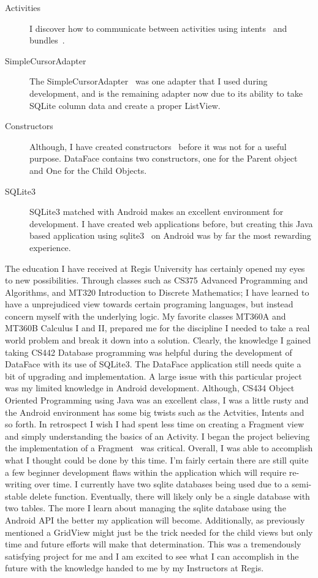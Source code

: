 \documentclass[fontsize=11pt, %
paper=a4, %
twoside, %
captions=tableheading,
index=totoc,
hyperref]{labbook}
\begin{document}
\begin{description}
\item[Activities] I discover how to communicate between activities using intents~\citep{Intent} and bundles~\citep{Bundle}.
\item[SimpleCursorAdapter] The SimpleCursorAdapter~\citep{SimpleCursorAdapter} was one adapter that I used during development, and is the remaining adapter now due to its ability to take SQLite column data and create a proper ListView.
\item[Constructors] Although, I have created constructors~\citep{Ravi} before it was not for a useful purpose. DataFace contains two constructors, one for the Parent object and One for the Child Objects.
\item[SQLite3] SQLite3 matched with Android makes an excellent environment for development. I have created web applications before, but creating this Java based application using sqlite3~\citep{vogella} on Android was by far the most rewarding experience.
\end{description}
\begin{onehalfspace}
	The education I have received at Regis University has certainly opened my eyes to new possibilities. Through classes such as CS375 Advanced Programming and Algorithms, and MT320 Introduction to Discrete Mathematics; I have learned to have a unprejudiced view towards certain programing languages, but instead concern myself with the underlying logic. My favorite classes MT360A and MT360B Calculus I and II, prepared me for the discipline I needed to take a real world problem and break it down into a solution. Clearly, the knowledge I gained taking CS442 Database programming was helpful during the development of DataFace with its use of SQLite3. The DataFace application still needs quite a bit of upgrading and implementation. A large issue with this particular project was my limited knowledge in Android development. Although, CS434 Object Oriented Programming using Java was an excellent class, I was a little rusty and the Android environment has some big twists such as the Actvities, Intents and so forth. In retrospect I wish I had spent less time on creating a Fragment view and simply understanding the basics of an Activity. I began the project believing the implementation of a Fragment~\citep{fragments} was critical.  Overall, I was able to accomplish what I thought could be done by this time. I'm fairly certain there are still quite a few beginner development flaws within the application which will require re-writing over time. I currently have two sqlite databases being used due to a semi-stable delete function. Eventually, there will likely only be a single database with two tables. The more I learn about managing the sqlite database using the Android API the better my application will become. Additionally, as previously mentioned a GridView might just be the trick needed for the child views but only time and future efforts will make that determination. This was a tremendously satisfying project for me and I am excited to see what I can accomplish in the future with the knowledge handed to me by my Instructors at Regis. 
\end{onehalfspace}
\clearpage
\end{document}
